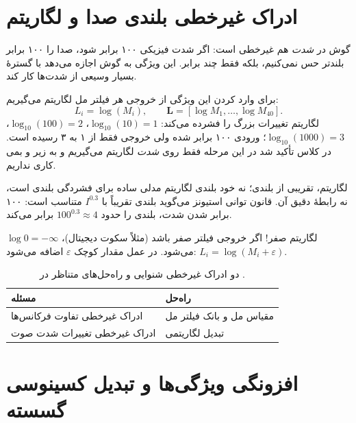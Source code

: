 \section{ادراک غیرخطی بلندی صدا و لگاریتم}

گوش در \emph{شدت} هم غیرخطی است: اگر شدت فیزیکی ۱۰۰ برابر شود، صدا را ۱۰۰ برابر بلندتر حس نمی‌کنیم، بلکه فقط چند برابر. این ویژگی به گوش اجازه می‌دهد با گسترهٔ بسیار وسیعی از شدت‌ها کار کند.

برای وارد کردن این ویژگی از خروجی هر فیلتر مل لگاریتم می‌گیریم:
\[
L_i=\log(M_i),\qquad \mathbf{L}=[\log M_1,\ldots,\log M_{40}].
\]
لگاریتم تغییرات بزرگ را فشرده می‌کند: $\log_{10}(10)=1$، $\log_{10}(100)=2$، $\log_{10}(1000)=3$؛ ورودی ۱۰۰ برابر شده ولی خروجی فقط از ۱ به ۳ رسیده است. در کلاس تأکید شد در این مرحله فقط روی \emph{شدت} لگاریتم می‌گیریم و به زیر و بمی کاری نداریم.

\begin{correctionbox}{لگاریتم، تقریبی از بلندی؛ نه خود بلندی}
لگاریتم مدلی ساده برای فشردگی بلندی است، نه رابطهٔ دقیق آن. قانون توانی استیونز می‌گوید بلندی تقریباً با $I^{0.3}$ متناسب است: ۱۰۰ برابر شدن شدت، بلندی را حدود $100^{0.3}\approx4$ برابر می‌کند.
\end{correctionbox}

\begin{warningbox}{لگاریتم صفر!}
اگر خروجی فیلتر صفر باشد (مثلاً سکوت دیجیتال)، $\log 0=-\infty$ می‌شود. در عمل مقدار کوچک $\varepsilon$ اضافه می‌شود: $L_i=\log(M_i+\varepsilon)$.
\end{warningbox}

\begin{table}[htbp]
\centering
\caption{دو ادراک غیرخطی شنوایی و راه‌حل‌های متناظر در .}
\begin{tabular}{p{5.5cm}p{6cm}}
\toprule
\textbf{مسئله} & \textbf{راه‌حل} \\
\midrule
ادراک غیرخطی تفاوت فرکانس‌ها & مقیاس مل و بانک فیلتر مل \\
ادراک غیرخطی تغییرات شدت صوت & تبدیل لگاریتمی \\
\bottomrule
\end{tabular}
\end{table}

\section{افزونگی ویژگی‌ها و تبدیل کسینوسی گسسته}

